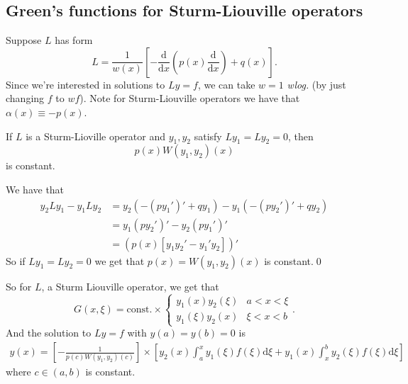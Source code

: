\documentclass{article}
\begin{document}
\subsection{Green's functions for Sturm-Liouville operators}
Suppose $ L $ has form
\[
	L=\frac1{w(x)}\left[-\frac{\mathrm d}{\mathrm dx}\left(p(x)\frac{\mathrm d}{\mathrm dx}\right)+q(x)\right].
\]
Since we're interested in solutions to $ Ly=f $, we can take $ w=1 $ \textit{wlog.} (by just changing $ f $ to $ wf $). Note for Sturm-Liouville operators we have that $ \alpha(x)\equiv -p(x) $.
\begin{proposition}
  If $ L $ is a Sturm-Lioville operator and $ y_1,y_2 $ satisfy $ Ly_1=Ly_2=0 $, then
  \[
	  p(x)W(y_1,y_2)(x)
  \]
  is constant.
\end{proposition}
\pf We have that
\begin{align*}
	y_2Ly_1-y_1Ly_2 &= y_2(-(py_1')'+qy_1)-y_1(-(py_2')'+qy_2)\\
			&= y_1(py_2')'-y_2(py_1')'\\
			&= (p(x)[y_1y_2'-y_1'y_2])'
\end{align*}
So if $ Ly_1=Ly_2=0 $ we get that $ p(x)=W(y_1,y_2)(x) $ is constant.\qed
\par
So for $ L $, a Sturm Liouville operator, we get that 
\[
	G(x,\xi)=\text{const.} \times \begin{cases}
		y_1(x)y_2(\xi) & a<x<\xi \\
		y_1(\xi)y_2(x) & \xi< x < b
	\end{cases}.
\]
And the solution to $ Ly=f $ with $ y(a)=y(b)=0 $ is
\begin{align*}
	y(x)=\left[-\frac{1}{p(c)W(y_1,y_2)(c)}\right]\times\left[y_2(x)\int_a^x y_1(\xi)f(\xi)\mathrm d\xi+y_1(x)\int_x^by_2(\xi)f(\xi)\mathrm d\xi\right]
\end{align*}
where $ c\in (a,b) $ is constant.
\end{document}
